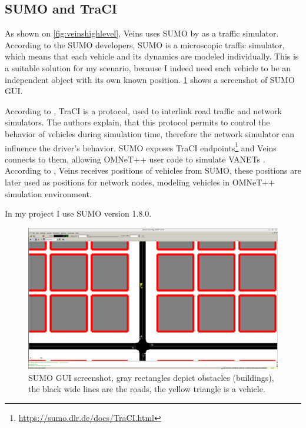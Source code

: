 \documentclass[]{nsm-thesis}
\begin{document}
\subsection{SUMO and TraCI}
As shown on \cref{fig:veinshighlevel}, Veins uses SUMO by \textcite[Page~218]{sumo2018} as a traffic simulator. According to the SUMO developers, SUMO is a microscopic traffic simulator, which means that each vehicle and its dynamics are modeled individually.
This is a suitable solution for my scenario, because I indeed need each vehicle to be an independent object with its own known position. \cref{fig:sumogui} shows a screenshot of SUMO \ac{GUI}.

According to \textcite{traci}, \ac{TraCI} is a protocol, used to interlink road traffic and network simulators. The authors explain, that this protocol permits to control the behavior of vehicles during simulation time, therefore the network simulator can influence the driver's behavior. SUMO exposes \ac{TraCI} endpoints\footnote{\url{https://sumo.dlr.de/docs/TraCI.html}} and Veins connects to them, allowing OMNeT++ user code to simulate \acp{VANET} \cite[Pages~217-218]{Sommer2019}. According to \textcite{Sommer2019}, Veins receives positions of vehicles from SUMO, these positions are later used as positions for network nodes, modeling vehicles in OMNeT++ simulation environment.

In my project I use SUMO version 1.8.0.

\begin{figure}
	\centering
	\includegraphics[width=1\textwidth]{figures/SUMO-GUI.png}
	\caption{SUMO \ac{GUI} screenshot, gray rectangles depict obstacles (buildings), the black wide lines are the roads, the yellow triangle is a vehicle.}
	\label{fig:sumogui}
\end{figure}
\end{document}
